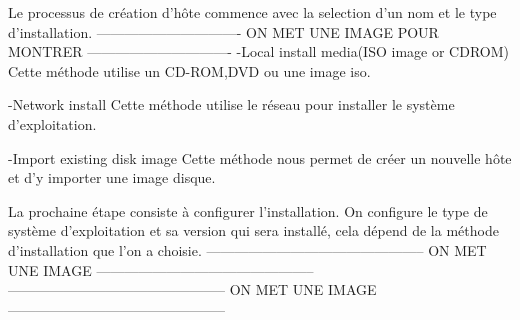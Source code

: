 Le processus de création d'hôte commence avec la selection d'un nom et le type d'installation.
-------------------------------
ON MET UNE IMAGE POUR MONTRER
-------------------------------
-Local install media(ISO image or CDROM)
Cette méthode utilise un CD-ROM,DVD ou une image iso.

-Network install
Cette méthode utilise le réseau pour installer le système d'exploitation.

-Import existing disk image
Cette méthode nous permet de créer un nouvelle hôte et d'y importer une image disque.

La prochaine étape consiste à configurer l'installation.
On configure le type de système d'exploitation et sa version qui sera installé, cela dépend de la méthode d'installation que l'on a choisie.
-----------------------------------------------
ON MET UNE IMAGE
-----------------------------------------------
-----------------------------------------------
ON MET UNE IMAGE
-----------------------------------------------

